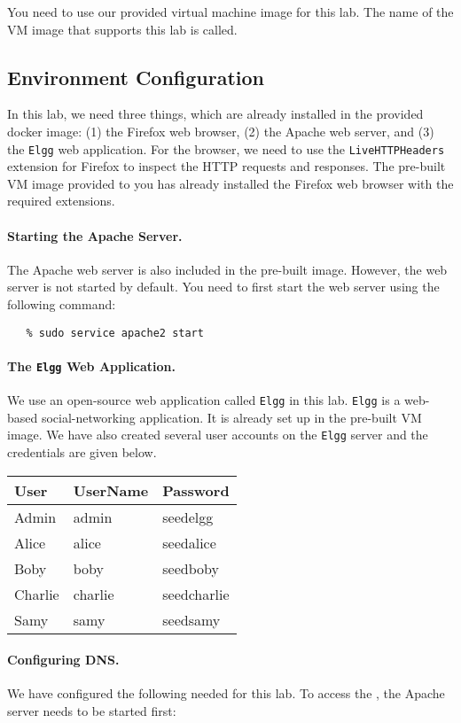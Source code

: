 

You need to use our provided virtual machine image for this lab.
The name of the VM image that supports this lab is called.


\subsection{Environment Configuration}

In this lab, we need three things, which are already 
installed in the provided docker image: (1) the Firefox web browser,
(2) the Apache web server, and (3) the {\tt Elgg} 
web application. For the browser,
we need to use the \texttt{LiveHTTPHeaders} extension for Firefox to
inspect the HTTP requests and responses. The pre-built \ubuntu
VM image provided to you has already installed the Firefox web browser with the
required extensions. 


\paragraph{Starting the Apache Server.}
The Apache web server is also included in the pre-built \ubuntu
image. However, the web server is not started by default.
You need to first start the web server using the
following command:
\begin{verbatim}
   % sudo service apache2 start
\end{verbatim}

\paragraph{The {\tt Elgg} Web Application.}
We use an open-source web application called {\tt Elgg} in this lab.
{\tt Elgg} is a web-based social-networking application. 
It is already set up in the 
pre-built \ubuntu VM image. 
We have also created several user accounts on the {\tt Elgg} server and the credentials are given below.


\vspace{0.1in}
\begin{tabular}{|l|l|l|}
\hline
User 	& UserName 	& Password\\
\hline
Admin 	& admin 	& seedelgg \\
Alice 	& alice 	& seedalice \\
Boby 	& boby 		& seedboby \\
Charlie & charlie 	& seedcharlie \\
Samy 	& samy 		& seedsamy \\
\hline
\end{tabular}
\vspace{0.1in}


\paragraph{Configuring DNS.}
We have configured the following \urlorurls needed for this lab. To access 
the \urlorurls, the Apache server needs to be started first:
